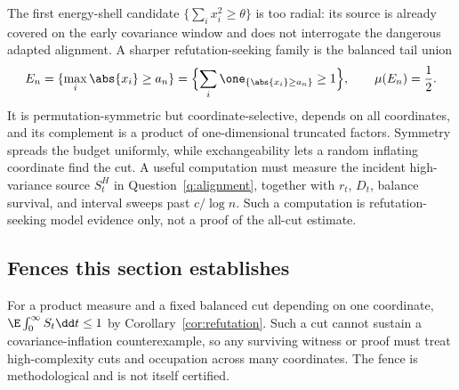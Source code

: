 \documentclass[../../main.tex]{subfiles}
\begin{document}
\begin{remark}
\label{rem:test-family}
The first energy-shell candidate $\{\sum_i x_i^2\ge\theta\}$ is too radial: its source is already
covered on the early covariance window and does not interrogate the dangerous adapted alignment.
A sharper refutation-seeking family is the balanced tail union
\[
  E_n=\{\max_i\abs{x_i}\ge a_n\}
     =\Bigl\{\sum_i\one_{\{\abs{x_i}\ge a_n\}}\ge1\Bigr\},
  \qquad \mu(E_n)=\frac12.
\]
It is permutation-symmetric but coordinate-selective, depends on all coordinates, and its
complement is a product of one-dimensional truncated factors. Symmetry spreads the budget
uniformly, while exchangeability lets a random inflating coordinate find the cut. A useful
computation must measure the incident high-variance source $S_t^H$ in
Question~\ref{q:alignment}, together with $r_t$, $D_t$, balance survival, and interval sweeps
past $c/\log n$. Such a computation is refutation-seeking model evidence only, not a proof of
the all-cut estimate.
\end{remark}
\subsection{Fences this section establishes}
\label{subsec:product-fences}

\begin{obstruction}
\label{obs:rank-one-refuted}
For a product measure and a fixed balanced cut depending on one coordinate,
\(\E\int_0^\infty S_t\dd t\le1\) by Corollary~\ref{cor:refutation}. Such a cut cannot sustain a
covariance-inflation counterexample, so any surviving witness or proof must treat
high-complexity cuts and occupation across many coordinates. The fence is methodological and is
not itself certified.
\end{obstruction}
\end{document}
